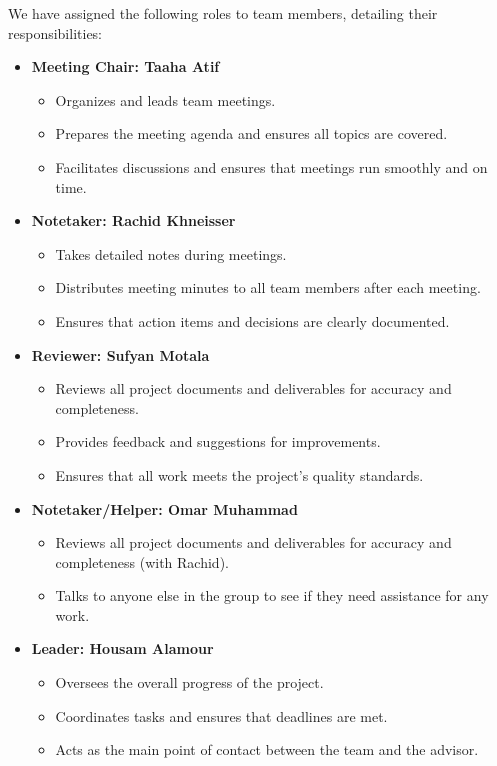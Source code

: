 \documentclass{article}
\begin{document}
We have assigned the following roles to team members, detailing their responsibilities:

\begin{itemize}
    \item \textbf{Meeting Chair: Taaha Atif}
    \begin{itemize}
        \item Organizes and leads team meetings.
        \item Prepares the meeting agenda and ensures all topics are covered.
        \item Facilitates discussions and ensures that meetings run smoothly and on time.
    \end{itemize}

    \item \textbf{Notetaker: Rachid Khneisser}
    \begin{itemize}
        \item Takes detailed notes during meetings.
        \item Distributes meeting minutes to all team members after each meeting.
        \item Ensures that action items and decisions are clearly documented.
    \end{itemize}

    \item \textbf{Reviewer: Sufyan Motala}
    \begin{itemize}
        \item Reviews all project documents and deliverables for accuracy and completeness.
        \item Provides feedback and suggestions for improvements.
        \item Ensures that all work meets the project’s quality standards.
    \end{itemize}

    \item \textbf{Notetaker/Helper: Omar Muhammad}
    \begin{itemize}
        \item Reviews all project documents and deliverables for accuracy and completeness (with Rachid).
        \item Talks to anyone else in the group to see if they need assistance for any work.
    \end{itemize}

    \item \textbf{Leader: Housam Alamour}
    \begin{itemize}
        \item Oversees the overall progress of the project.
        \item Coordinates tasks and ensures that deadlines are met.
        \item Acts as the main point of contact between the team and the advisor.
    \end{itemize}
\end{itemize}
\end{document}
